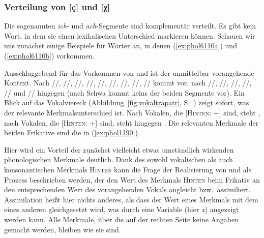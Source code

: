 \subsubsection{Verteilung von [ç] und [χ]}

\label{sec:prozichach}

Die sogenannten \textit{ich}- und \textit{ach}-Segmente sind komplementär verteilt.
Es gibt kein Wort, in dem sie einen lexikalischen Unterschied markieren können.
Schauen wir uns zunächst einige Beispiele für Wörter an, in denen \textipa{[\c{c}]} (\ref{ex:phol6110a}) und \textipa{[X]} (\ref{ex:phol6110b}) vorkommen.

\begin{exe}
  \ex\label{ex:phol6110}
  \begin{xlist}
  \end{xlist}
\end{exe}

Ausschlaggebend für das Vorkommen von \textipa{[\c{c}]} und \textipa{[X]} ist der unmittelbar vorangehende Kontext.
Nach //, //, //, //, //, /\textipa{\o}/, //, //, /\textipa{\oe}/ kommt \textipa{[\c{c}]} vor, nach //, //, //, //, // und // hingegen \textipa{[X]} (nach Schwa kommt keins der beiden Segmente vor).
Ein Blick auf das Vokalviereck (Abbildung~\ref{fig:vokaltrapatr}, S.~\pageref{fig:vokaltrapatr}) zeigt sofort, was der relevante Merkmalsunterschied ist.
Nach Vokalen, die [\textsc{Hinten}: $-$] sind, steht \textipa{[\c{c}]}, nach Vokalen, die [\textsc{Hinten}: $+$] sind, steht hingegen \textipa{[X]}.
Die relevanten Merkmale der beiden Frikative sind die in (\ref{ex:phol1190}).

\begin{exe}
  \ex\label{ex:phol1190}
  \begin{xlist}
  \end{xlist}
\end{exe}

Hier wird ein Vorteil der zunächst vielleicht etwas umständlich wirkenden phonologischen Merkmale deutlich.
Dank des sowohl vokalischen als auch konsonantischen Merkmals \textsc{Hinten} kann die Frage der Realisierung von \textipa{[\c{c}]} und \textipa{[X]} als Prozess beschrieben werden, der den Wert des Merkmals \textsc{Hinten} beim Frikativ an den entsprechenden Wert des vorangehenden Vokals angleicht bzw.\ assimiliert.
Assimilation heißt hier nichts anderes, als dass der Wert eines Merkmals mit dem eines anderen gleichgesetzt wird, was durch eine Variable (hier \textit{x}) angezeigt werden kann.
Alle Merkmale, über die auf der rechten Seite keine Angaben gemacht werden, bleiben wie sie sind.

